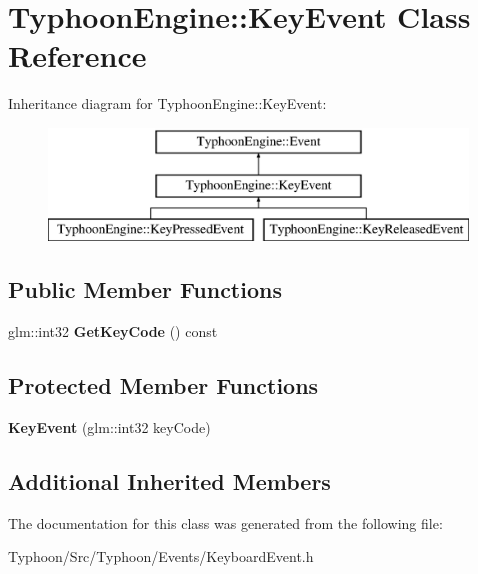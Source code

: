 \hypertarget{class_typhoon_engine_1_1_key_event}{}\section{Typhoon\+Engine\+::Key\+Event Class Reference}
\label{class_typhoon_engine_1_1_key_event}
Inheritance diagram for Typhoon\+Engine\+::Key\+Event\+:\begin{figure}[H]
\begin{center}
\leavevmode
\includegraphics[height=3.000000cm]{class_typhoon_engine_1_1_key_event}
\end{center}
\end{figure}
\subsection*{Public Member Functions}
\begin{DoxyCompactItemize}
\item 
\mbox{\label{class_typhoon_engine_1_1_key_event_abd48cbafad15ca7b2c63c0fbc14fe362}} 
glm\+::int32 {\bfseries Get\+Key\+Code} () const
\end{DoxyCompactItemize}
\subsection*{Protected Member Functions}
\begin{DoxyCompactItemize}
\item 
\mbox{\label{class_typhoon_engine_1_1_key_event_a91597d93dd4c5078ae13046291a01bdb}} 
{\bfseries Key\+Event} (glm\+::int32 key\+Code)
\end{DoxyCompactItemize}
\subsection*{Additional Inherited Members}


The documentation for this class was generated from the following file\+:\begin{DoxyCompactItemize}
\item 
Typhoon/\+Src/\+Typhoon/\+Events/Keyboard\+Event.\+h\end{DoxyCompactItemize}
